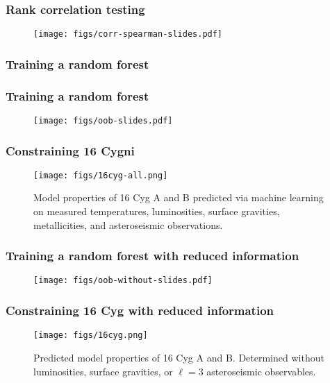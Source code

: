 \documentclass[10pt, compress]{beamer}
\begin{document}
\begin{frame}[fragile] \frametitle{Rank correlation testing}
    \begin{figure}[!hb] 
        \vspace*{-0.5cm}
        \centering
        \texttt{[image: figs/corr-spearman-slides.pdf]}
    \end{figure}
\end{frame}

\begin{frame}[fragile, label=current] \frametitle{Training a random forest}
    \begin{figure}[!hb] 
        \hspace{-5mm}
        \centering
        
    \end{figure}
\end{frame}

\begin{frame}[fragile] \frametitle{Training a random forest}
    \begin{figure}[!hb] 
        \centering
        \texttt{[image: figs/oob-slides.pdf]}
    \end{figure}
\end{frame}

\begin{frame}[fragile] \frametitle{Constraining 16 Cygni}
    \begin{figure}
        \centering
        \texttt{[image: figs/16cyg-all.png]}
        \caption{Model properties of 16 Cyg {\color{red} A} and {\color{blue} B} predicted via machine learning on measured temperatures, luminosities, surface gravities, metallicities, and asteroseismic observations.}
    \end{figure}
\end{frame}

\begin{frame}[fragile] \frametitle{Training a random forest with reduced information}
    \begin{figure}[!hb] 
        \centering
        \texttt{[image: figs/oob-without-slides.pdf]}
    \end{figure}
\end{frame}

\begin{frame}[fragile] \frametitle{Constraining 16 Cyg with reduced information}
    \begin{figure}
        \centering
        \texttt{[image: figs/16cyg.png]}
        \caption{Predicted model properties of 16 Cyg {\color{red} A} and {\color{blue} B}. Determined without luminosities, surface gravities, or $\ell=3$ asteroseismic observables.}
    \end{figure}
\end{frame}
\end{document}
